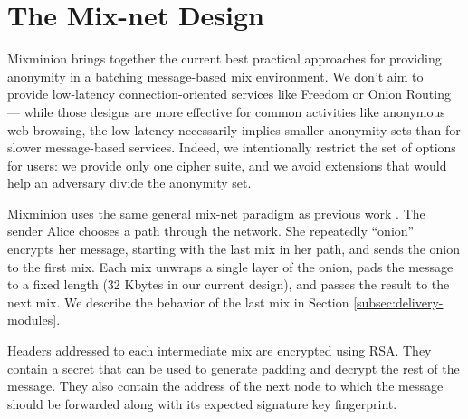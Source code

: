 \documentclass[11pt]{IEEEtran}
\begin{document}

\section{The Mix-net Design}
\label{sec:design}

Mixminion brings together the current best practical approaches for providing
anonymity in a batching message-based mix environment. We don't aim
to provide low-latency connection-oriented services like Freedom
\cite{freedom} or Onion Routing \cite{goldschlag99} --- while those
designs are more effective for common activities like anonymous web
browsing, the low latency necessarily implies smaller anonymity sets
than for slower message-based services. Indeed, we intentionally
restrict the set of options for users: we provide only one
cipher suite, and we avoid extensions that would help an adversary
divide the anonymity set.

Mixminion uses the same general mix-net paradigm as previous work
\cite{chaum-mix}\cite{mixmaster-attacks}\cite{babel}. The sender Alice chooses a
path through the network. She repeatedly ``onion'' encrypts her message,
starting with the last
mix in her path, and sends the onion to the first mix. Each
mix unwraps a single layer of the onion, pads the message to a fixed
length (32 Kbytes in our current design), and passes the result to the
next mix. We describe the behavior of the last mix in
Section \ref{subsec:delivery-modules}.


Headers addressed to each intermediate mix are encrypted using RSA.
They contain a secret 
that can be used to generate padding and decrypt the rest
of the message. They also contain the address of the next node to 
which the message should be forwarded along with its expected signature 
key fingerprint.


\end{document}
